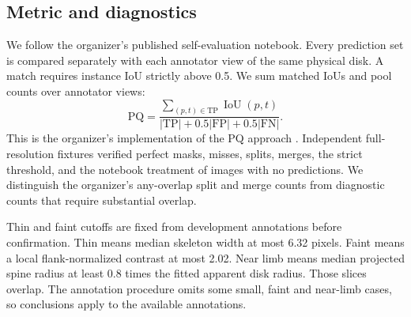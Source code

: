 \subsection{Metric and diagnostics}
We follow the organizer's published self-evaluation notebook. Every prediction set is compared separately with each annotator view of the same physical disk. A match requires instance IoU strictly above 0.5. We sum matched IoUs and pool counts over annotator views:
\[
 \mathrm{PQ}=\frac{\sum_{(p,t)\in\mathrm{TP}}\operatorname{IoU}(p,t)}
 {|\mathrm{TP}|+0.5|\mathrm{FP}|+0.5|\mathrm{FN}|}.
\]
This is the organizer's implementation of the PQ approach \cite{kirillov2019panoptic}. Independent full-resolution fixtures verified perfect masks, misses, splits, merges, the strict threshold, and the notebook treatment of images with no predictions. We distinguish the organizer's any-overlap split and merge counts from diagnostic counts that require substantial overlap.

Thin and faint cutoffs are fixed from development annotations before confirmation. Thin means median skeleton width at most 6.32 pixels. Faint means a local flank-normalized contrast at most 2.02. Near limb means median projected spine radius at least 0.8 times the fitted apparent disk radius. Those slices overlap. The annotation procedure omits some small, faint and near-limb cases, so conclusions apply to the available annotations.


